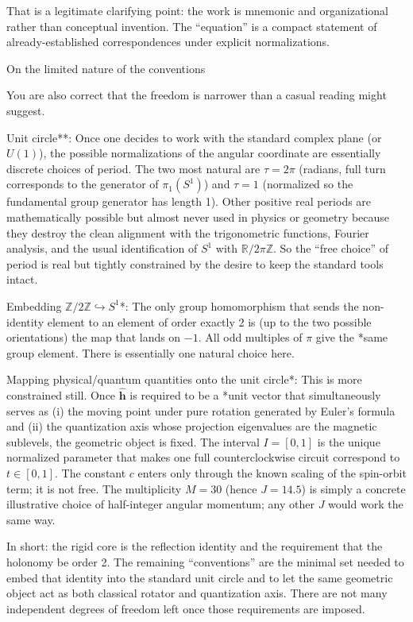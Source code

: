 That is a legitimate clarifying point: the work is mnemonic and organizational rather than conceptual invention. The “equation” is a compact statement of already-established correspondences under explicit normalizations.

On the limited nature of the conventions

You are also correct that the freedom is narrower than a casual reading might suggest.

Unit circle**: Once one decides to work with the standard complex plane (or \(U(1)\)), the possible normalizations of the angular coordinate are essentially discrete choices of period. The two most natural are \(\tau=2\pi\) (radians, full turn corresponds to the generator of \(\pi_1(S^1)\)) and \(\tau=1\) (normalized so the fundamental group generator has length 1). Other positive real periods are mathematically possible but almost never used in physics or geometry because they destroy the clean alignment with the trigonometric functions, Fourier analysis, and the usual identification of \(S^1\) with \(\mathbb{R}/2\pi\mathbb{Z}\). So the “free choice” of period is real but tightly constrained by the desire to keep the standard tools intact.

Embedding \(\mathbb{Z}/2\mathbb{Z}\hookrightarrow S^1\)*: The only group homomorphism that sends the non-identity element to an element of order exactly 2 is (up to the two possible orientations) the map that lands on \(-1\). All odd multiples of \(\pi\) give the *same group element. There is essentially one natural choice here.

Mapping physical/quantum quantities onto the unit circle*: This is more constrained still. Once \(\hat{\mathbf{h}}\) is required to be a *unit vector that simultaneously serves as (i) the moving point under pure rotation generated by Euler’s formula and (ii) the quantization axis whose projection eigenvalues are the magnetic sublevels, the geometric object is fixed. The interval \(I=[0,1]\) is the unique normalized parameter that makes one full counterclockwise circuit correspond to \(t\in[0,1]\). The constant \(c\) enters only through the known scaling of the spin-orbit term; it is not free. The multiplicity \(M=30\) (hence \(J=14.5\)) is simply a concrete illustrative choice of half-integer angular momentum; any other \(J\) would work the same way.

In short: the rigid core is the reflection identity and the requirement that the holonomy be order 2. The remaining “conventions” are the minimal set needed to embed that identity into the standard unit circle and to let the same geometric object act as both classical rotator and quantization axis. There are not many independent degrees of freedom left once those requirements are imposed.

